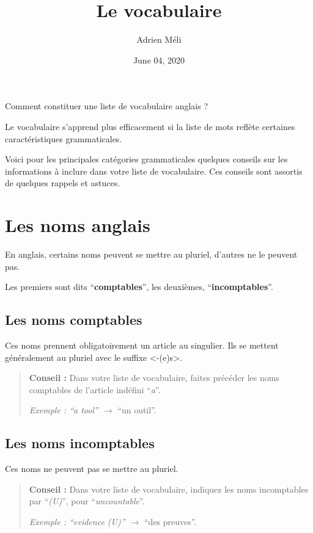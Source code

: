 \documentclass[
  10pt,
]{article}
\title{Le vocabulaire}
\author{Adrien Méli}
\date{June 04, 2020}
\begin{document}
\maketitle

{
\setcounter{tocdepth}{1}
\tableofcontents
}
Comment constituer une liste de vocabulaire anglais ?

Le vocabulaire s'apprend plus efficacement si la liste de mots reflète certaines caractéristiques grammaticales.

Voici pour les principales catégories grammaticales quelques conseils sur les informations à inclure dans votre liste de vocabulaire.
Ces conseils sont assortis de quelques rappels et astuces.

\hypertarget{les-noms-anglais}{%
\section{Les noms anglais}\label{les-noms-anglais}}

En anglais, certains noms peuvent se mettre au pluriel, d'autres ne le peuvent pas.

Les premiers sont dits ``\textbf{comptables}'', les deuxièmes, ``\textbf{incomptables}''.

\hypertarget{les-noms-comptables}{%
\subsection{Les noms comptables}\label{les-noms-comptables}}

Ces noms prennent obligatoirement un article au singulier.
Ils se mettent généralement au pluriel avec le suffixe \textless-(e)s\textgreater.

\begin{quote}
\textbf{Conseil :} Dans votre liste de vocabulaire, faites précéder les noms comptables de l'article indéfini ``\emph{a}''.

\emph{Exemple : ``a tool'' \(\rightarrow\)} ``un outil''.
\end{quote}

\hypertarget{les-noms-incomptables}{%
\subsection{Les noms incomptables}\label{les-noms-incomptables}}

Ces noms ne peuvent pas se mettre au pluriel.

\begin{quote}
\textbf{Conseil :} Dans votre liste de vocabulaire, indiquez les noms incomptables par ``\emph{(U)}'', pour ``\emph{uncountable}''.

\emph{Exemple : ``evidence (U)'' \(\rightarrow\)} ``des preuves''.
\end{quote}
\end{document}
